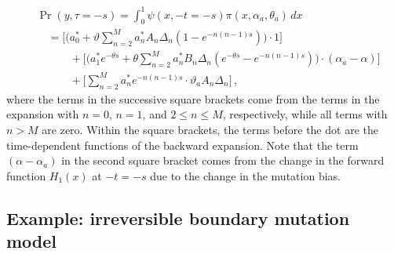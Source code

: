 \documentclass[preprint]{elsarticle}
\begin{document}
\begin{equation}
\begin{split}
    &\Pr(y,\tau=-s)=\int_0^1 \psi(x,-t=-s)\pi(x,\alpha_a,\theta_a)\,dx\\
    &\quad=\bigg[\bigg(a_0^{*}+\vartheta\sum_{n=2}^M a_n^{*}A_n\Delta_n  (1-e^{-n(n-1)s})\bigg)\cdot 1\bigg]\\ &\quad\qquad+\bigg[\bigg(a_1^{*} e^{-\theta s}+\theta\sum_{n=2}^M a_n^{*}B_n\Delta_n(e^{-\theta s}- e^{-n(n-1)s})\bigg)\cdot (\alpha_a-\alpha)\bigg]\\
    &\quad\qquad+\bigg[\sum_{n=2}^M a_n^{*} e^{-n(n-1)s}\cdot \vartheta_a A_n\Delta_n\bigg]\,,
\end{split}
\end{equation}
where the terms in the successive square brackets come from the terms in the expansion with $n=0$, $n=1$, and $2\leq n\leq M$, respectively, while all terms with $n>M$ are zero. Within the square brackets, the terms before the dot are the time-dependent functions of the backward expansion. Note that the term $(\alpha-\alpha_a)$ in the second square bracket comes from the change in the forward function $H_1(x)$ at $-t=-s$  due to the change in the mutation bias. 

\subsection{Example: irreversible boundary mutation model %
}\label{section:irreversible_diffusion}
\end{document}
